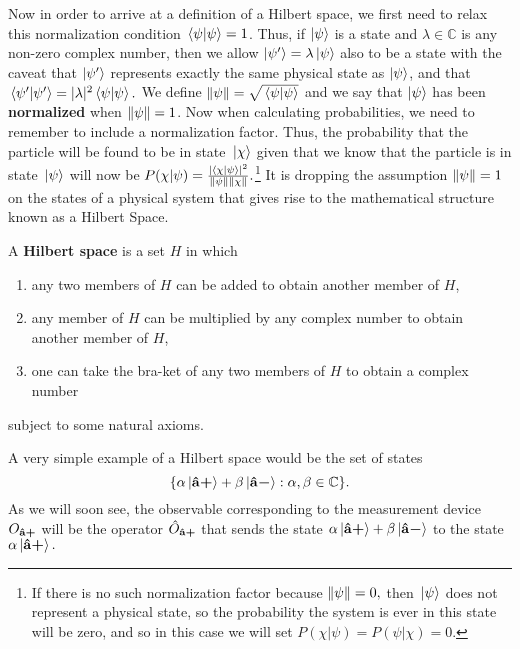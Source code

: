Now in order to arrive at a definition of a Hilbert space, we first need to relax this normalization condition $\ip*{\psi}{\psi}=1$. Thus, if $\ket{\psi}$  is a state and $\lambda\in\mathbb{C}$ is any non-zero complex number, then we allow $\ket{\psi'}=\lambda\ket{\psi}$ also to be a state with the caveat that $\ket{\psi'}$ represents exactly the same physical state as $\ket{\psi}$, and that $\ip*{\psi'}{\psi'}=|\lambda|^2\ip*{\psi}{\psi}.$ We define $\norm{\psi}=\sqrt{\ip*{\psi}{\psi}}$ %
%
and we say that $\ket{\psi}$ has been \textbf{normalized} when $\norm{\psi}=1$. Now when calculating probabilities, we need to remember to include a normalization factor. Thus, the probability that the particle will be found to be in state $\ket*{\chi}$ given that we know that the particle is in state $\ket*{\psi}$ will now be $P(\chi|\psi) = \frac{|\ip*{\chi}{\psi}|^2}{\norm{\psi}\norm{\chi}}.$\footnote{ If there is no such normalization factor because $\norm{\psi}=0,$ then $\ket*{\psi}$ does not represent a physical state, so the probability the system is ever in this state will be zero, and so in this case we will set $P(\chi|\psi)=P(\psi|\chi)=0.$} It is  dropping the assumption $\norm{\psi}=1$ on the states of a physical system that gives rise to the mathematical structure known as a Hilbert Space.   

A \textbf{Hilbert space} is a set $H$ %
%
in which 
\begin{enumerate}[noitemsep, nosep, topsep=0pt]
\item any two members of $H$ can be added to obtain another member of $H$, 
\item any member of $H$ can be multiplied by any complex number to obtain another member of $H$,
\item one can take the bra-ket of any two members of $H$ to obtain a complex number\end{enumerate}
subject to some natural axioms.\footnotemark

A very simple example of a Hilbert space would be the set of states 
$$\{\alpha\ket*{{\vb{\hat{{a}}}\bm{+}}}+\beta\ket*{{\vb{\hat{{a}}}\bm{-}}}:\alpha,\beta\in\mathbb{C}\}.$$ 
As we will soon see, the observable corresponding to the measurement device $O_{{\vb{\hat{{a}}}\bm{+}}}$ will be the operator $\hat{O}_{{\vb{\hat{{a}}}\bm{+}}}$ that sends the state $\alpha\ket*{{\vb{\hat{{a}}}\bm{+}}}+\beta\ket*{{\vb{\hat{{a}}}\bm{-}}}$ to the state $\alpha\ket*{{\vb{\hat{{a}}}\bm{+}}}.$

